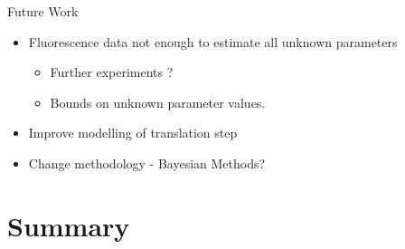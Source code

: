 \documentclass{beamer}
\begin{document}
\begin{frame}{Future Work}

  \begin{itemize}
  \item Fluorescence data \alert {not enough} to estimate all unknown parameters 
  \begin{itemize}
  \item Further experiments ?
  \item Bounds on unknown parameter values.
  \end{itemize} 
  \item Improve modelling of translation step
  \item Change methodology - Bayesian Methods?

  \end{itemize}
  
  \end{frame}
  
  \section*{Summary}
\end{document}

